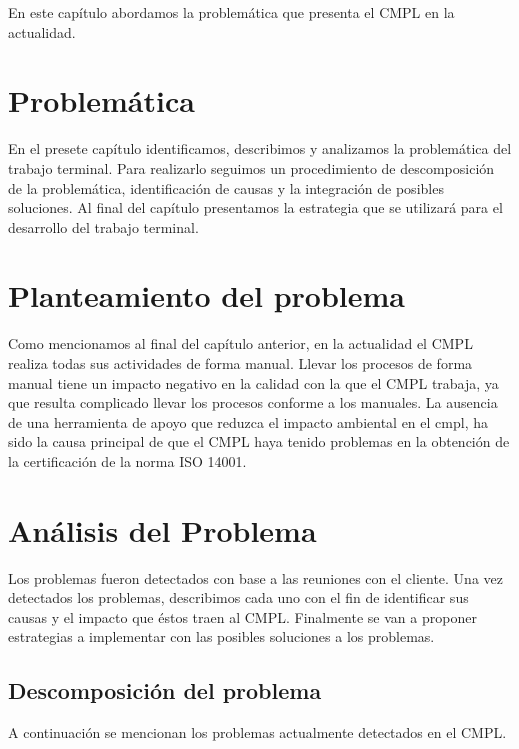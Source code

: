 En este capítulo abordamos la problemática que presenta el CMPL en la actualidad.

\section{Problemática}

En el presete capítulo identificamos, describimos y analizamos la problemática del trabajo terminal. Para realizarlo seguimos un procedimiento de descomposición de la problemática, identificación de causas y la integración de posibles soluciones. Al final del capítulo presentamos la estrategia que se utilizará para el desarrollo del trabajo terminal. 
\section{Planteamiento del problema}
Como mencionamos al final del capítulo anterior, en la actualidad el CMPL realiza todas sus actividades de forma manual. Llevar los procesos de forma manual tiene un impacto negativo en la calidad con la que el CMPL trabaja, ya que resulta complicado llevar los procesos conforme a los manuales. La ausencia de una herramienta de apoyo que reduzca el impacto ambiental en el cmpl, ha sido la causa principal de que el CMPL haya tenido problemas en la obtención de la certificación de la norma ISO 14001. 

\section{Análisis del Problema}
Los problemas fueron detectados con base a las reuniones con el cliente. Una vez detectados los problemas, describimos cada uno con el fin de identificar sus causas y el impacto que éstos traen al CMPL. Finalmente se van a proponer estrategias a implementar con las posibles soluciones a los problemas. 
	\subsection{Descomposición del problema}
	A continuación se mencionan los problemas actualmente detectados en el CMPL. 
